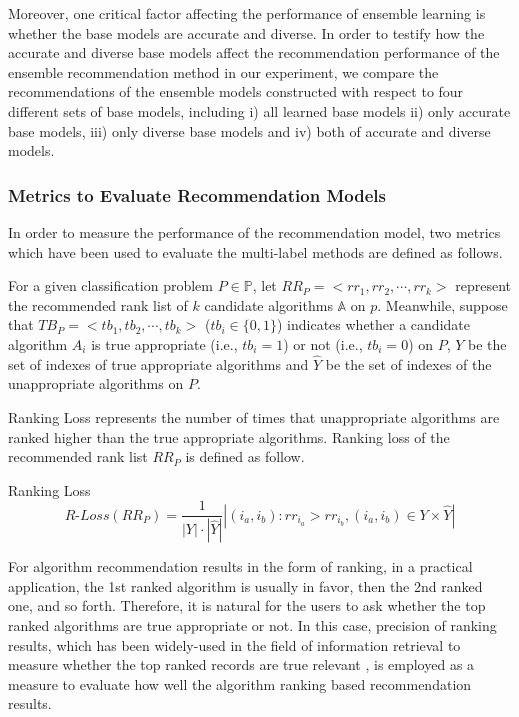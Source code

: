 \documentclass[prodmode,acmtkdd]{acmsmall}
\begin{document}
Moreover, one critical factor affecting the performance of ensemble
learning is whether the base models are accurate and diverse. In
order to testify how the accurate and diverse base models affect the
recommendation performance of the ensemble recommendation method in
our experiment, we compare the recommendations of the ensemble
models constructed with respect to four different sets of base
models, including i) all learned base models ii) only accurate base
models, iii) only diverse base models and iv) both of accurate and
diverse models.

\subsubsection{Metrics to Evaluate Recommendation
Models}\label{subsec:evaluateMetrics}

In order to measure the performance of the recommendation model, two
metrics which have been used to evaluate the multi-label methods are
defined as follows.

For a given classification problem $P \in \mathbb{P}$, let $RR_{P} =
<rr_1, rr_2, \cdots, rr_k>$ represent the recommended rank list of
$k$ candidate algorithms $\mathbb{A}$ on $p$. Meanwhile, suppose
that $TB_{P} = <tb_1, tb_2, \cdots, tb_k>$ ($tb_{i} \in \{0, 1\}$)
indicates whether a candidate algorithm $A_i$ is true appropriate
(i.e., $tb_i = 1$) or not (i.e., $tb_i = 0$) on $P$, $Y$ be the set
of indexes of true appropriate algorithms and $\hat{Y}$ be the set
of indexes of the unappropriate algorithms on $P$.

Ranking Loss represents the number of times that unappropriate
algorithms are ranked higher than the true appropriate algorithms.
Ranking loss of the recommended rank list $RR_{P}$ is defined as
follow.

\begin{definition} Ranking Loss \label{def:rankingLoss}
    \begin{equation}
        R\text{-}Loss(RR_{P}) = \frac{1}{|Y|\cdot |\hat{Y}|}|(i_a, i_b): rr_{i_a} > rr_{i_b},(i_a, i_b) \in Y\times\hat{Y}|
    \end{equation}
\end{definition}

For algorithm recommendation results in the form of ranking, in a
practical application, the 1st ranked algorithm is usually in favor,
then the 2nd ranked one, and so forth. Therefore, it is natural for
the users to ask whether the top ranked algorithms are true
appropriate or not. In this case, precision of ranking results,
which has been widely-used in the field of information retrieval to
measure whether the top ranked records are true relevant
\cite{baeza1999modern}, is employed as a measure to evaluate how
well the algorithm ranking based recommendation results.
\end{document}

